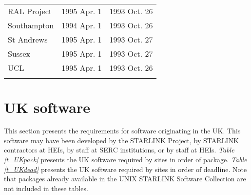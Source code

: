 \begin{table}
\begin{center}
\begin{tabular}{|l|l|l|}
RAL Project           & 1995 Apr. 1  & 1993 Oct. 26 \\
Southampton           & 1994 Apr. 1  & 1993 Oct. 26 \\
St Andrews            & 1995 Apr. 1  & 1993 Oct. 27 \\
Sussex                & 1995 Apr. 1  & 1993 Oct. 27 \\
UCL                   & 1995 Apr. 1  & 1993 Oct. 26 \\
& & \\ \hline
\end{tabular}
\end{center}
\end{table}


\newpage
\section{UK software}

This section presents the requirements for software originating in the UK.
This software may have been developed by the STARLINK Project, by STARLINK
contractors at HEIs, by staff at SERC institutions, or by staff at HEIs.
{\em Table \ref{t_UKpack}} presents the UK software required by sites in
order of package.
{\em Table \ref{t_UKdead}} presents the UK software required by sites in
order of deadline.
Note that packages already available in the UNIX STARLINK Software Collection
are not included in these tables.


